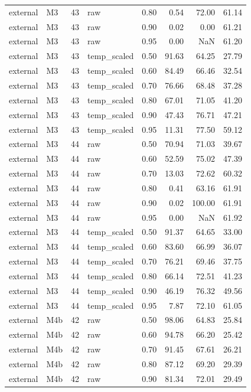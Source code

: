 \begin{tabular}{llrlrrrr}
external & M3 & 43 & raw & 0.80 & 0.54 & 72.00 & 61.14 \\
external & M3 & 43 & raw & 0.90 & 0.02 & 0.00 & 61.21 \\
external & M3 & 43 & raw & 0.95 & 0.00 & NaN & 61.20 \\
external & M3 & 43 & temp\_scaled & 0.50 & 91.63 & 64.25 & 27.79 \\
external & M3 & 43 & temp\_scaled & 0.60 & 84.49 & 66.46 & 32.54 \\
external & M3 & 43 & temp\_scaled & 0.70 & 76.66 & 68.48 & 37.28 \\
external & M3 & 43 & temp\_scaled & 0.80 & 67.01 & 71.05 & 41.20 \\
external & M3 & 43 & temp\_scaled & 0.90 & 47.43 & 76.71 & 47.21 \\
external & M3 & 43 & temp\_scaled & 0.95 & 11.31 & 77.50 & 59.12 \\
external & M3 & 44 & raw & 0.50 & 70.94 & 71.03 & 39.67 \\
external & M3 & 44 & raw & 0.60 & 52.59 & 75.02 & 47.39 \\
external & M3 & 44 & raw & 0.70 & 13.03 & 72.62 & 60.32 \\
external & M3 & 44 & raw & 0.80 & 0.41 & 63.16 & 61.91 \\
external & M3 & 44 & raw & 0.90 & 0.02 & 100.00 & 61.91 \\
external & M3 & 44 & raw & 0.95 & 0.00 & NaN & 61.92 \\
external & M3 & 44 & temp\_scaled & 0.50 & 91.37 & 64.65 & 33.00 \\
external & M3 & 44 & temp\_scaled & 0.60 & 83.60 & 66.99 & 36.07 \\
external & M3 & 44 & temp\_scaled & 0.70 & 76.21 & 69.46 & 37.75 \\
external & M3 & 44 & temp\_scaled & 0.80 & 66.14 & 72.51 & 41.23 \\
external & M3 & 44 & temp\_scaled & 0.90 & 46.19 & 76.32 & 49.56 \\
external & M3 & 44 & temp\_scaled & 0.95 & 7.87 & 72.10 & 61.05 \\
external & M4b & 42 & raw & 0.50 & 98.06 & 64.83 & 25.84 \\
external & M4b & 42 & raw & 0.60 & 94.78 & 66.20 & 25.42 \\
external & M4b & 42 & raw & 0.70 & 91.45 & 67.61 & 26.21 \\
external & M4b & 42 & raw & 0.80 & 87.12 & 69.20 & 29.39 \\
external & M4b & 42 & raw & 0.90 & 81.34 & 72.01 & 29.49 \\

\end{tabular}
